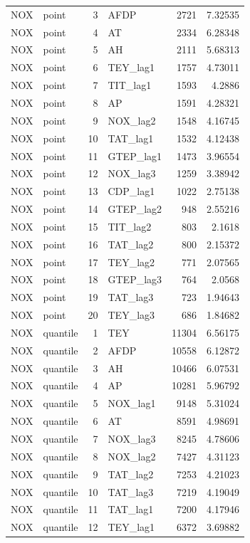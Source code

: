 \begin{tabular}{llrlrr}
NOX & point & 3 & AFDP & 2721 & 7.32535 \\
NOX & point & 4 & AT & 2334 & 6.28348 \\
NOX & point & 5 & AH & 2111 & 5.68313 \\
NOX & point & 6 & TEY\_lag1 & 1757 & 4.73011 \\
NOX & point & 7 & TIT\_lag1 & 1593 & 4.2886 \\
NOX & point & 8 & AP & 1591 & 4.28321 \\
NOX & point & 9 & NOX\_lag2 & 1548 & 4.16745 \\
NOX & point & 10 & TAT\_lag1 & 1532 & 4.12438 \\
NOX & point & 11 & GTEP\_lag1 & 1473 & 3.96554 \\
NOX & point & 12 & NOX\_lag3 & 1259 & 3.38942 \\
NOX & point & 13 & CDP\_lag1 & 1022 & 2.75138 \\
NOX & point & 14 & GTEP\_lag2 & 948 & 2.55216 \\
NOX & point & 15 & TIT\_lag2 & 803 & 2.1618 \\
NOX & point & 16 & TAT\_lag2 & 800 & 2.15372 \\
NOX & point & 17 & TEY\_lag2 & 771 & 2.07565 \\
NOX & point & 18 & GTEP\_lag3 & 764 & 2.0568 \\
NOX & point & 19 & TAT\_lag3 & 723 & 1.94643 \\
NOX & point & 20 & TEY\_lag3 & 686 & 1.84682 \\
NOX & quantile & 1 & TEY & 11304 & 6.56175 \\
NOX & quantile & 2 & AFDP & 10558 & 6.12872 \\
NOX & quantile & 3 & AH & 10466 & 6.07531 \\
NOX & quantile & 4 & AP & 10281 & 5.96792 \\
NOX & quantile & 5 & NOX\_lag1 & 9148 & 5.31024 \\
NOX & quantile & 6 & AT & 8591 & 4.98691 \\
NOX & quantile & 7 & NOX\_lag3 & 8245 & 4.78606 \\
NOX & quantile & 8 & NOX\_lag2 & 7427 & 4.31123 \\
NOX & quantile & 9 & TAT\_lag2 & 7253 & 4.21023 \\
NOX & quantile & 10 & TAT\_lag3 & 7219 & 4.19049 \\
NOX & quantile & 11 & TAT\_lag1 & 7200 & 4.17946 \\
NOX & quantile & 12 & TEY\_lag1 & 6372 & 3.69882 \\

\end{tabular}
